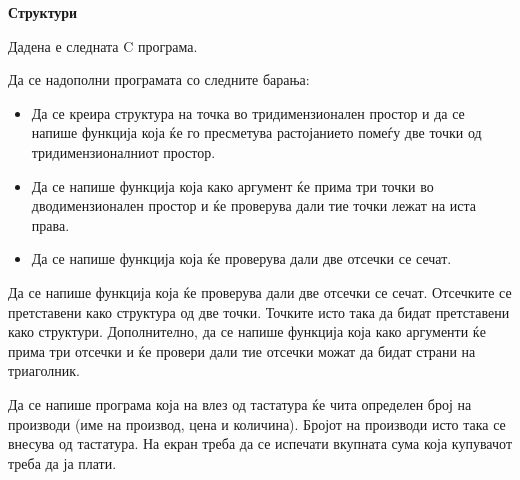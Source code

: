 \documentclass[12pt,a4paper]{exam}
\begin{document}
\pagestyle{headandfoot}
\headrule
{}
\begin{center}
\Large{\textbf{Структури}}
\end{center}
\begin{questions}

\question
Дадена е следната C програма.

Да се надополни програмата со следните барања:
\begin{itemize}
  \item Да се креира структура на точка во тридимензионален простор и да се
  напише функција која ќе го пресметува растојанието помеѓу две точки од тридимензионалниот простор.
  \item Да се напише функција која како аргумент ќе прима три точки во
  дводимензионален простор и ќе проверува дали тие точки лежат на иста права.
  \item Да се напише функција која ќе проверува дали две отсечки се сечат.
\end{itemize}

\question
Да се напише функција која ќе проверува дали две отсечки се сечат. Отсечките се
претставени како структура од две точки. Точките исто така да бидат претставени
како структури.  Дополнително, да се напише функција која како аргументи ќе
прима три отсечки и ќе провери дали тие отсечки можат да бидат страни на триаголник. 

\question
Да се напише програма која на влез од тастатура ќе чита определен број на
производи (име на производ, цена и количина). Бројот на производи исто така се
внесува од тастатура. На екран треба да се испечати вкупната сума која купувачот
треба да ја плати.


\end{questions}
\end{document}
